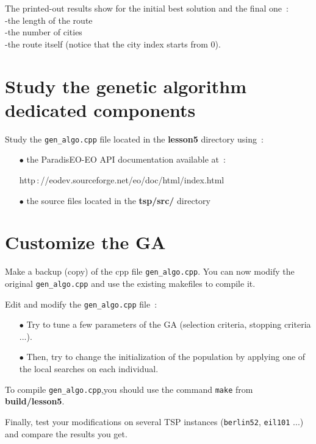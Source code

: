 \documentclass[a4paper]{article}
\begin{document}
    \medskip

    The printed-out results show for the initial best solution and the final one~:
    \\ \hspace*{0.5cm}-the length of the route
    \\ \hspace*{0.5cm}-the number of cities
    \\ \hspace*{0.5cm}-the route itself (notice that the city index starts from 0).


\section{Study the genetic algorithm dedicated components}

    Study the {\tt gen\_algo.cpp} file located in the {\bf lesson5} directory
    using~:
    \begin{itemize}
       \item[$\bullet$] the ParadisEO-EO API documentation available at~:

       \hspace{1cm}http$\,:$//eodev.sourceforge.net/eo/doc/html/index.html

       \item[$\bullet$] the source files located in the {\bf tsp/src/} directory
    \end{itemize}


\section{Customize the GA}

    Make a backup (copy) of the cpp file {\tt gen\_algo.cpp}. You can now modify the
    original {\tt gen\_algo.cpp} and use the existing makefiles to compile it.

    Edit and modify the {\tt gen\_algo.cpp} file~:
    \begin{itemize}
       \item[$\bullet$] Try to tune a few parameters of the GA
       (selection criteria, stopping criteria ...).
       \item[$\bullet$] Then, try to change the initialization of the population
       by applying one of the local searches on each individual.
    \end{itemize}

    \smallskip
    To compile {\tt gen\_algo.cpp},you should use the
    command {\tt make} from {\bf build/lesson5}.

    \medskip
    Finally, test your modifications on several TSP instances ({\tt berlin52},
    {\tt eil101} ...) and compare the results you get.
\end{document}

